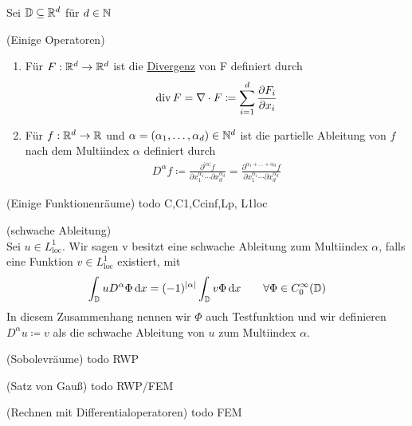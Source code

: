 Sei $\mathbb{D} \subseteq \mathbb{R}^d$ für $d\in \mathbb{N}$
\begin{Definition}(Einige Operatoren)
	\begin{enumerate}
		\item Für $F: \mathbb{R}^d \to \mathbb{R}^d$ ist die \underline{Divergenz} von F definiert durch
			\begin{align*}
				\operatorname{div} F = \nabla \cdot F \coloneqq \sum_{i=1}^{d} \frac{\partial F_i}{ \partial x_i}
			\end{align*}
		\item Für $f: \mathbb{R}^d \to \mathbb{R}$ und $\alpha = (\alpha_1,\dots,\alpha_d) \in \mathbb{N}^d$ ist die partielle Ableitung von $f$ nach dem Multiindex $\alpha$ definiert durch
			\begin{align*}
				D^{\alpha}f \coloneqq 
				\frac{\partial^{|\alpha|} f}{\partial x_1 ^{\alpha_1} \cdots  \partial x_d^{\alpha_d} } 
				=\frac{\partial^{\alpha_1+\dots +\alpha_d} f}{\partial x_1 ^{\alpha_1} \cdots  \partial x_d^{\alpha_d} } 
			\end{align*}
	\end{enumerate}
\end{Definition}
\begin{Definition}(Einige Funktionenräume)
	todo C,C1,Ccinf,Lp, L1loc
\end{Definition}
\begin{Definition}(schwache Ableitung)\\
	Sei $u \in L_{\text{loc}}^1$. Wir sagen v besitzt eine schwache Ableitung zum Multiindex $\alpha$, falls eine Funktion $v \in L_{\text{loc}}^1$ existiert, mit 
	\begin{align*}
		\int_{\mathbb{D}} u D^{\alpha} \Phi \, \mathrm{d} x = (-1)^{|\alpha|} \int_{\mathbb{D}} v \Phi \, \mathrm{d} x \qquad \forall \Phi \in C_0^{\infty}(\mathbb{D})
	\end{align*}
	In diesem Zusammenhang nennen wir $\Phi$ auch Testfunktion und wir definieren $D^{\alpha} u \coloneqq v$ als die schwache Ableitung von $u$ zum Multiindex $\alpha$.
\end{Definition}
\begin{Definition}(Sobolevräume)
	todo RWP 
\end{Definition}
\begin{Satz} (Satz von Gauß)
	todo RWP/FEM
\end{Satz}
\begin{Satz} (Rechnen mit Differentialoperatoren)
	todo FEM
\end{Satz}